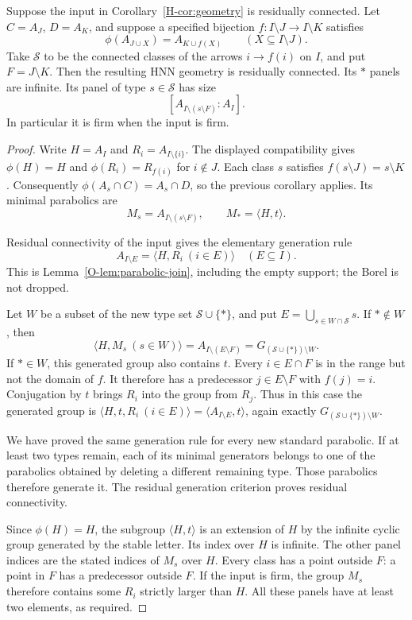 \begin{corollary}\label{H-cor:rc}
Suppose the input in Corollary~\ref{H-cor:geometry} is residually connected.
Let $C=A_J$, $D=A_K$, and suppose a specified bijection
$f:I\setminus J\longrightarrow I\setminus K$ satisfies
\[
 \phi(A_{J\cup X})=A_{K\cup f(X)}\qquad(X\subseteq I\setminus J).
\]
Take $\mathcal S$ to be the connected classes of the arrows $i\to f(i)$
on $I$, and put $F=J\setminus K$. Then the resulting HNN geometry is
residually connected. Its $*$ panels are infinite. Its panel of type
$s\in\mathcal S$ has size
\[
 [A_{I\setminus(s\setminus F)}:A_I].
\]
In particular it is firm when the input is firm.
\end{corollary}
\begin{proof}
Write $H=A_I$ and $R_i=A_{I\setminus\{i\}}$.
The displayed compatibility gives $\phi(H)=H$ and
$\phi(R_i)=R_{f(i)}$ for $i\notin J$.
Each class $s$ satisfies $f(s\setminus J)=s\setminus K$.
Consequently $\phi(A_s\cap C)=A_s\cap D$, so the previous corollary
applies. Its minimal parabolics are
\[
 M_s=A_{I\setminus(s\setminus F)},\qquad M_*=\langle H,t\rangle.
\]

Residual connectivity of the input gives the elementary generation rule
\[
 A_{I\setminus E}=\langle H,R_i\ (i\in E)\rangle
 \quad(E\subseteq I).
\]
This is Lemma~\ref{O-lem:parabolic-join}, including the empty support; the Borel is not dropped.

Let $W$ be a subset of the new type set $\mathcal S\cup\{*\}$, and
put $E=\bigcup_{s\in W\cap\mathcal S}s$. If $*\notin W$, then
\[
 \langle H,M_s\ (s\in W)\rangle
 =A_{I\setminus(E\setminus F)}=G_{(\mathcal S\cup\{*\})\setminus W}.
\]
If $*\in W$, this generated group also contains $t$.
Every $i\in E\cap F$ is in the range but not the domain of $f$.
It therefore has a predecessor $j\in E\setminus F$ with $f(j)=i$.
Conjugation by $t$ brings $R_i$ into the group from $R_j$.
Thus in this case the generated group is
$\langle H,t,R_i\ (i\in E)\rangle=\langle A_{I\setminus E},t\rangle$,
again exactly $G_{(\mathcal S\cup\{*\})\setminus W}$.

We have proved the same generation rule for every new standard parabolic.
If at least two types remain, each of its minimal generators belongs to
one of the parabolics obtained by deleting a different remaining type.
Those parabolics therefore generate it. The residual generation criterion
proves residual connectivity.

Since $\phi(H)=H$, the subgroup $\langle H,t\rangle$ is an extension
of $H$ by the infinite cyclic group generated by the stable letter.
Its index over $H$ is infinite. The other panel indices are the stated
indices of $M_s$ over $H$. Every class has a point outside $F$: a point
in $F$ has a predecessor outside $F$. If the input is firm, the group
$M_s$ therefore contains some $R_i$ strictly larger than $H$.
All these panels have at least two elements, as required.
\end{proof}


